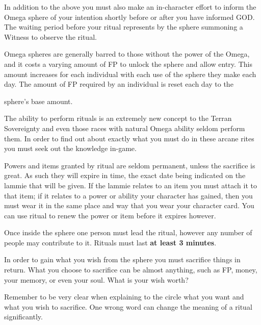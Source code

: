 In addition to the above you must also make an in-character effort to inform the Omega sphere of your intention shortly before or after you have informed GOD. The waiting period before your ritual represents by the sphere summoning a Witness to observe the ritual.

Omega spheres are generally barred to those without the power of the Omega, and it costs a varying amount of FP to unlock the sphere and allow entry. This amount increases for each individual with each use of the sphere they make each day. The amount of FP required by an individual is reset each day to the

sphere's base amount.

The ability to perform rituals is an extremely new concept to the Terran Sovereignty and even those races with natural Omega ability seldom perform them. In order to find out about exactly what you must do in these arcane rites you must seek out the knowledge in-game.

Powers and items granted by ritual are seldom permanent, unless the sacrifice is great. As such they will expire in time, the exact date being indicated on the lammie that will be given. If the lammie relates to an item you must attach it to that item; if it relates to a power or ability your character has gained, then you must wear it in the same place and way that you wear your character card. You can use ritual to renew the power or item before it expires however.

Once inside the sphere one person must lead the ritual, however any number of people may contribute to it. Rituals must last \textbf{at least 3 minutes}.

In order to gain what you wish from the sphere you must sacrifice things in return. What you choose to sacrifice can be almost anything, such as FP, money, your memory, or even your soul. What is your wish worth?

Remember to be very clear when explaining to the circle what you want and what you wish to sacrifice. One wrong word can change the meaning of a ritual significantly.
